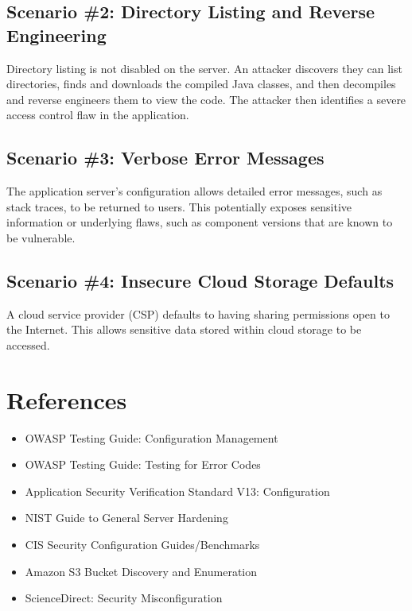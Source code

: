 \documentclass[11pt]{article}
\begin{document}
\subsection{Scenario \#2: Directory Listing and Reverse Engineering}
Directory listing is not disabled on the server. An attacker discovers they can list directories, finds and downloads the compiled Java classes, and then decompiles and reverse engineers them to view the code. The attacker then identifies a severe access control flaw in the application.

\subsection{Scenario \#3: Verbose Error Messages}
The application server's configuration allows detailed error messages, such as stack traces, to be returned to users. This potentially exposes sensitive information or underlying flaws, such as component versions that are known to be vulnerable.

\subsection{Scenario \#4: Insecure Cloud Storage Defaults}
A cloud service provider (CSP) defaults to having sharing permissions open to the Internet. This allows sensitive data stored within cloud storage to be accessed.

\section{References}
\begin{itemize}
  \item OWASP Testing Guide: Configuration Management
  \item OWASP Testing Guide: Testing for Error Codes
  \item Application Security Verification Standard V13: Configuration
  \item NIST Guide to General Server Hardening
  \item CIS Security Configuration Guides/Benchmarks
  \item Amazon S3 Bucket Discovery and Enumeration
  \item ScienceDirect: Security Misconfiguration
\end{itemize}

\newpage
\end{document}
